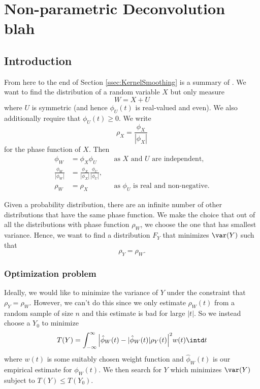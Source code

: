 \chapter{Non-parametric Deconvolution blah}
\label{Ch:NonparametricDeconvolution}



\section{Introduction}
From here to the end of Section \ref{ssec:KernelSmoothing} is a summary of \cite{Delaigle2016-la}.
We want to find the distribution of a random variable $X$ but only measure 
$$W = X + U$$
where $U$ is symmetric (and hence $\phi_U(t)$ is real-valued and even). We also additionally require that $\phi_U(t) \geq 0$. We write
$$\rho_X = \frac{\phi_X}{|\phi_X|}$$
for the phase function of $X$. Then 
\begin{align*}
\phi_W &= \phi_X \phi_U	&&\text{as $X$ and $U$ are independent,}\\
\frac{\phi_W}{|\phi_W|} &= \frac{\phi_X}{|\phi_X|}\frac{\phi_U}{|\phi_U|},\\
\rho_W &= \rho_X	&&\text{as $\phi_U$ is real and non-negative.}
\end{align*}

Given a probability distribution, there are an infinite number of other distributions that have the same phase function. We make the choice that out of all the distributions with phase function $\rho_W$, we choose the one that has smallest variance. Hence, we want to find a distribution $F_Y$ that minimizes $\var(Y)$ such that
$$\rho_Y = \rho_W.$$

\subsection{Optimization problem}
\label{ssec:optimizationproblem}
Ideally, we would like to minimize the variance of $Y$ under the constraint that $\rho_Y = \rho_W$. However, we can't do this since we only estimate $\rho_W(t)$ from a random sample of size $n$ and this estimate is bad for large $|t|$. So we instead choose a $Y_0$ to minimize 
\begin{equation}
T(Y) = \int_{-\infty}^{\infty} \Big| \hat{\phi}_W(t) - |\hat{\phi}_W(t)| \rho_Y(t) \Big|^2 w(t) \intd t
\end{equation}\label{eq:T(Y)}
where $w(t)$ is some suitably chosen weight function and $\hat{\phi}_W(t)$ is our empirical estimate for $\phi_W(t)$. We then search for $Y$ which minimizes $\var(Y)$ subject to $T(Y) \leq T(Y_0)$.

